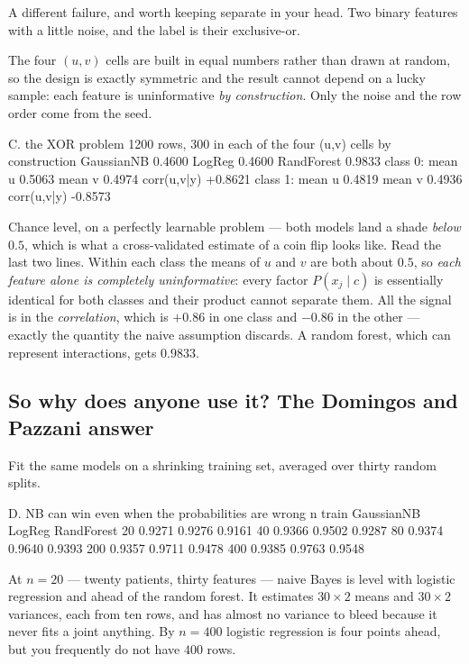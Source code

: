 \documentclass[11pt]{article}
\begin{document}
A different failure, and worth keeping separate in your head. Two binary
features with a little noise, and the label is their exclusive-or.

The four $(u,v)$ cells are built in equal numbers rather than drawn at
random, so the design is exactly symmetric and the result cannot depend on a
lucky sample: each feature is uninformative \emph{by construction}. Only the
noise and the row order come from the seed.

\begin{codeout}
C. the XOR problem
   1200 rows, 300 in each of the four (u,v) cells by construction
   GaussianNB   0.4600
   LogReg       0.4600
   RandForest   0.9833
      class 0: mean u 0.5063  mean v 0.4974  corr(u,v|y) +0.8621
      class 1: mean u 0.4819  mean v 0.4936  corr(u,v|y) -0.8573
\end{codeout}

Chance level, on a perfectly learnable problem --- both models land a shade
\emph{below} $0.5$, which is what a cross-validated estimate of a coin flip
looks like. Read the last two lines. Within each class the means of $u$ and
$v$ are both about $0.5$, so \emph{each feature alone is completely
uninformative}: every factor $P(x_j \mid c)$ is essentially identical for
both classes and their product cannot separate them. All the signal is in the
\emph{correlation}, which is $+0.86$ in one class and $-0.86$ in the other ---
exactly the quantity the naive assumption discards. A random forest, which can
represent interactions, gets $0.9833$.

\subsection{So why does anyone use it? The Domingos and Pazzani answer}

Fit the same models on a shrinking training set, averaged over thirty random
splits.

\begin{codeout}
D. NB can win even when the probabilities are wrong
    n train  GaussianNB    LogReg  RandForest
         20      0.9271    0.9276      0.9161
         40      0.9366    0.9502      0.9287
         80      0.9374    0.9640      0.9393
        200      0.9357    0.9711      0.9478
        400      0.9385    0.9763      0.9548
\end{codeout}

At $n = 20$ --- twenty patients, thirty features --- naive Bayes is level
with logistic regression and ahead of the random forest. It estimates
$30 \times 2$ means and $30 \times 2$ variances, each from ten rows, and has
almost no variance to bleed because it never fits a joint anything. By
$n = 400$ logistic regression is four points ahead, but you frequently do not
have $400$ rows.
\end{document}
